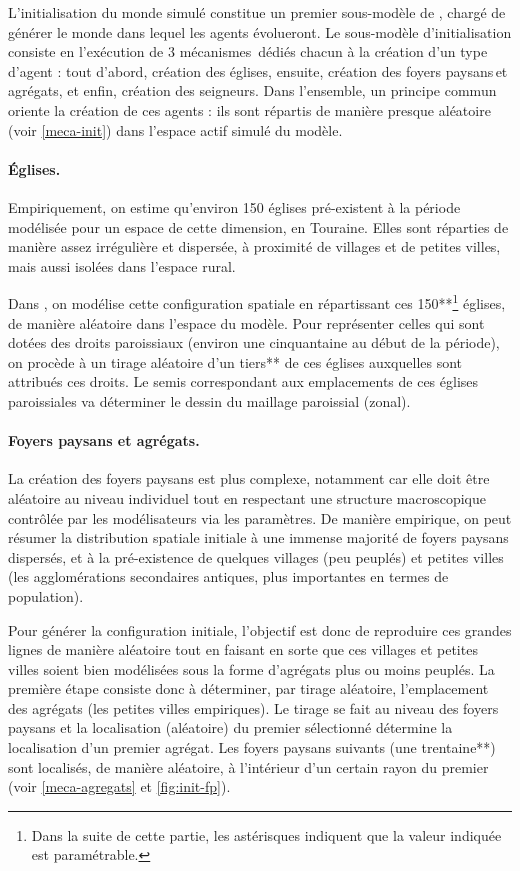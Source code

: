 L'initialisation du monde simulé constitue un premier \og sous-modèle\fg{} de \simfeodal{}, chargé de générer le monde dans lequel les agents évolueront.
Le sous-modèle d'initialisation consiste en l'exécution de 3 mécanismes dédiés chacun à la création d'un type d'agent : tout d'abord, création des églises, ensuite, création des foyers paysans et agrégats, et enfin, création des seigneurs.
Dans l'ensemble, un principe commun oriente la création de ces agents : ils sont répartis de manière presque aléatoire (voir \cref{meca-init}) dans l'espace \og actif\fg{} simulé du modèle.

\paragraph{Églises.}
Empiriquement, on estime qu'environ 150 églises pré-existent à la période modélisée pour un espace de cette dimension, en Touraine.
Elles sont réparties de manière assez irrégulière et dispersée, à proximité de villages et de petites villes, mais aussi isolées dans l'espace rural.

Dans \simfeodal{}, on modélise cette configuration spatiale en répartissant ces 150**\footnote{
Dans la suite de cette partie, les astérisques indiquent que la valeur indiquée est paramétrable.
} églises, de manière aléatoire dans l'espace du modèle.
Pour représenter celles qui sont dotées des droits paroissiaux (environ une cinquantaine au début de la période), on procède à un tirage aléatoire d'un tiers** de ces églises auxquelles sont attribués ces droits.
Le semis correspondant aux emplacements de ces églises paroissiales va déterminer le dessin du maillage paroissial (zonal).


\paragraph{Foyers paysans et agrégats.}
La création des foyers paysans est plus complexe, notamment car elle doit être aléatoire au niveau individuel tout en respectant une structure macroscopique contrôlée par les modélisateurs via les paramètres.
De manière empirique, on peut résumer la distribution spatiale initiale à une immense majorité de foyers paysans dispersés, et à la pré-existence de quelques villages (peu peuplés) et petites villes (les agglomérations secondaires antiques, plus importantes en termes de population).

Pour générer la configuration initiale, l'objectif est donc de reproduire ces grandes lignes de manière aléatoire tout en faisant en sorte que ces villages et petites villes soient bien modélisées sous la forme d'agrégats plus ou moins peuplés.
La première étape consiste donc à déterminer, par tirage aléatoire, l'emplacement des agrégats (les \og petites villes\fg{} empiriques).
Le tirage se fait au niveau des foyers paysans et la localisation (aléatoire) du premier sélectionné détermine la localisation d'un premier agrégat.
Les foyers paysans suivants (une trentaine**) sont localisés, de manière aléatoire, à l'intérieur d'un certain rayon du premier (voir \cref{meca-agregats} et \cref{fig:init-fp}).

